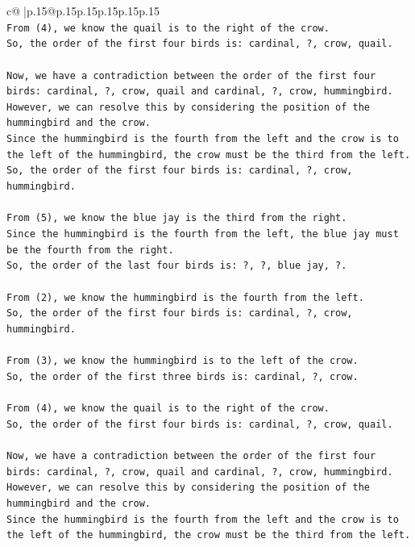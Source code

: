 \documentclass{article}
\begin{document}
{\begin{supertabular}{c@{$\;$}|p{.15\linewidth}@{}p{.15\linewidth}p{.15\linewidth}p{.15\linewidth}p{.15\linewidth}p{.15\linewidth}}
{{{\\ 
\texttt{From (4), we know the quail is to the right of the crow. } \\
\texttt{So, the order of the first four birds is: cardinal, ?, crow, quail.} \\
\\ 
\texttt{Now, we have a contradiction between the order of the first four birds: cardinal, ?, crow, quail and cardinal, ?, crow, hummingbird. } \\
\texttt{However, we can resolve this by considering the position of the hummingbird and the crow. } \\
\texttt{Since the hummingbird is the fourth from the left and the crow is to the left of the hummingbird, the crow must be the third from the left. } \\
\texttt{So, the order of the first four birds is: cardinal, ?, crow, hummingbird.} \\
\\ 
\texttt{From (5), we know the blue jay is the third from the right. } \\
\texttt{Since the hummingbird is the fourth from the left, the blue jay must be the fourth from the right. } \\
\texttt{So, the order of the last four birds is: ?, ?, blue jay, ?.} \\
\\ 
\texttt{From (2), we know the hummingbird is the fourth from the left. } \\
\texttt{So, the order of the first four birds is: cardinal, ?, crow, hummingbird.} \\
\\ 
\texttt{From (3), we know the hummingbird is to the left of the crow. } \\
\texttt{So, the order of the first three birds is: cardinal, ?, crow.} \\
\\ 
\texttt{From (4), we know the quail is to the right of the crow. } \\
\texttt{So, the order of the first four birds is: cardinal, ?, crow, quail.} \\
\\ 
\texttt{Now, we have a contradiction between the order of the first four birds: cardinal, ?, crow, quail and cardinal, ?, crow, hummingbird. } \\
\texttt{However, we can resolve this by considering the position of the hummingbird and the crow. } \\
\texttt{Since the hummingbird is the fourth from the left and the crow is to the left of the hummingbird, the crow must be the third from the left. } \\
}}}
\end{supertabular}}
\end{document}
